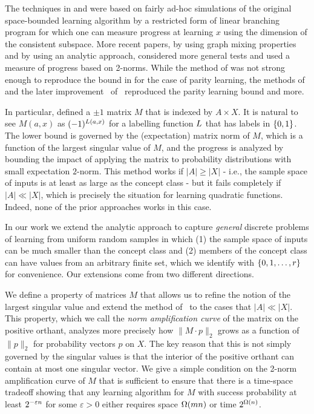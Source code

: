 The techniques in \cite{DBLP:conf/focs/Raz16} and \cite{DBLP:conf/stoc/KolRT17}
were based on fairly ad-hoc simulations of the original space-bounded
learning algorithm by a restricted form of linear branching program
for which one can measure progress at learning $x$ using the dimension of the
consistent subspace. 
More recent papers, by \cite{DBLP:conf/colt/MoshkovitzM17} using graph mixing properties
and by \cite{DBLP:conf/focs/Raz17}
using an analytic approach, considered more general 
tests and used a measure of progress based on 2-norms.
While the method of \cite{DBLP:conf/colt/MoshkovitzM17} was not strong
enough to reproduce the bound in \cite{DBLP:conf/focs/Raz16} for the
case of parity learning, the methods of \cite{DBLP:conf/focs/Raz17} and
the later improvement~\citep{DBLP:conf/innovations/MoshkovitzM18} of~\cite{DBLP:conf/colt/MoshkovitzM17}
reproduced the parity learning bound and more. 

In particular, \cite{DBLP:conf/focs/Raz17} defined a $\pm 1$
matrix $M$ that is indexed by $A\times X$.
It is natural to see $M(a,x)$ as $(-1)^{L(a,x)}$ for a labelling function
$L$ that has labels in $\{0,1\}$.
The lower bound is governed by the (expectation) matrix norm of $M$, which is 
a function of the largest singular value of $M$, and the progress is analyzed
by bounding the impact of applying the matrix to probability distributions with
small expectation $2$-norm.
This method works if $|A|\ge |X|$ - i.e., the sample space of inputs is at least as
large as the concept class - but it fails completely if $|A|\ll |X|$, which
is precisely the situation for learning quadratic functions.
Indeed, none of the prior approaches works in this case.

In our work we extend the analytic approach to capture \emph{general} discrete
problems of learning from uniform random samples in which (1) the sample space
of inputs can be much smaller than the concept class and (2) members of the concept class can have values from an arbitrary finite set, which we identify with
$\{0,1,\ldots,r\}$ for convenience.
Our extensions come from two different directions.

We define a property of matrices $M$ that allows us to refine the
notion of the largest singular value and extend the method
of~\cite{DBLP:conf/focs/Raz17} to the cases that $|A|\ll |X|$.
This property, which we call the
{\em norm amplification curve} of the matrix on the positive orthant,
analyzes more precisely
how $\|M\cdot p\|_2$ grows as a function of $\|p\|_2$ for probability
vectors $p$ on $X$. The key reason that this is not simply governed by the
singular values is that the interior of the positive orthant can contain at most one singular vector.
We give a simple condition on the 2-norm amplification curve of $M$ that
is sufficient to ensure that there is a time-space tradeoff showing
that any learning algorithm for $M$ with success probability at least $2^{-\varepsilon n}$ for some $\varepsilon>0$ either requires space $\Omega(mn)$ or
time $2^{\Omega(n)}$.

